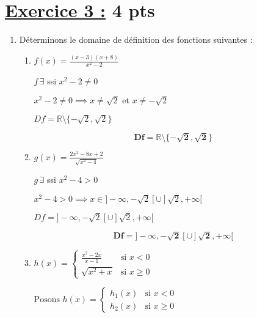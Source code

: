 \documentclass[12pt,a4paper]{article}
\begin{document}
\section*{\underline{Exercice 3 :} 4 pts }
\begin{enumerate}
    \item Déterminons le domaine de définition des fonctions suivantes :
          \begin{enumerate}
              \item  \( f(x) = \frac{(x - 3)(x + 8)}{x^2 - 2} \)

                    \(f\,\exists \) ssi \(x^2 - 2 \neq 0\)

                    \(x^2 - 2 \neq 0 \implies x \neq \sqrt{2} \text{ et } x \neq -\sqrt{2}\)

                    \( Df= \mathbb{R}\setminus\{-\sqrt{2},\sqrt{2}\} \)

                    \begin{resultbox}
                        \[
                            \mathbf{Df= \mathbb{R}\setminus\{-\sqrt{2},\sqrt{2}\} }
                        \]
                    \end{resultbox}
              \item \( g(x) = \frac{2x^2 - 8x + 2}{\sqrt{x^2 - 4}} \)

                    \(g\,\exists \) ssi \( x^2 - 4  > 0 \)

                    \( x^2 - 4  > 0 \implies x\in ]-\infty,-\sqrt{2}[ \cup ]\sqrt{2},+\infty[ \)

                        \( Df= ]-\infty,-\sqrt{2}[ \cup ]\sqrt{2},+\infty[ \)

                    \begin{resultbox}
                        \[
                            \mathbf{Df= ]-\infty,-\sqrt{2}[ \cup ]\sqrt{2},+\infty[ }
                        \]
                    \end{resultbox}
              \item \( h(x) = \left\{
                    \begin{array}{ll}
                        \frac{x^2 - 2x}{x - 1} & \text{si } x < 0    \\
                        \sqrt{x^2 + x}         & \text{si } x \geq 0
                    \end{array}
                    \right. \)

                    \( \text{Posons }h(x) = \left\{
                    \begin{array}{ll}
                        h_{1}(x) & \text{si } x < 0    \\
                        h_{2}(x)         & \text{si } x \geq 0
                    \end{array}
                    \right. \)
                    

\end{enumerate}
\end{enumerate}
\end{document}
